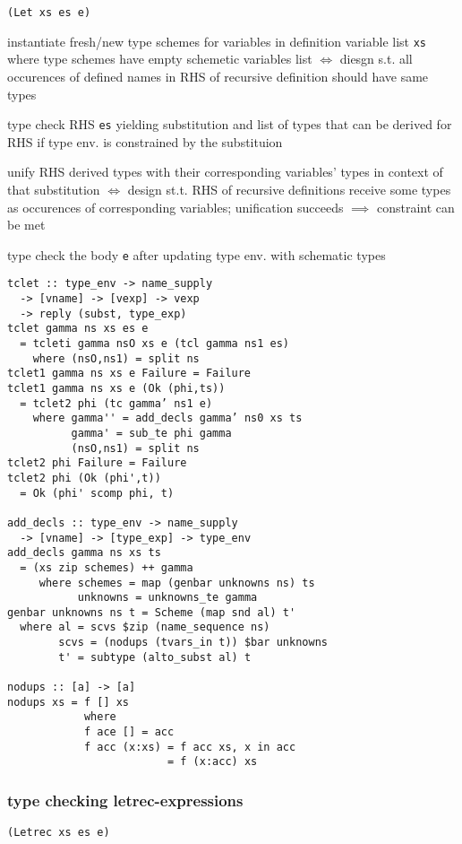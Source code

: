 \documentclass[8pt]{extarticle}
\begin{document}
\begin{multicols*}{2}
\verb|(Let xs es e)|

instantiate fresh/new type schemes for variables in definition variable list \verb|xs| where type schemes have empty schemetic variables list $\iff$ diesgn s.t. all occurences of defined names in RHS of recursive definition should have same types

type check RHS \verb|es| yielding substitution and list of types that can be derived for RHS if type env. is constrained by the substituion

unify RHS derived types with their corresponding variables' types in context of that substitution $\iff$ design st.t. RHS of recursive definitions receive some types as occurences of corresponding variables; unification succeeds $\implies$ constraint can be met

type check the body \verb|e| after updating type env. with schematic types

\begin{verbatim}
tclet :: type_env -> name_supply
  -> [vname] -> [vexp] -> vexp
  -> reply (subst, type_exp)
tclet gamma ns xs es e
  = tcleti gamma nsO xs e (tcl gamma ns1 es)
    where (nsO,ns1) = split ns
tclet1 gamma ns xs e Failure = Failure
tclet1 gamma ns xs e (Ok (phi,ts))
  = tclet2 phi (tc gamma’ ns1 e)
    where gamma'' = add_decls gamma’ ns0 xs ts
          gamma' = sub_te phi gamma
          (nsO,ns1) = split ns
tclet2 phi Failure = Failure
tclet2 phi (Ok (phi',t))
  = Ok (phi' scomp phi, t)

add_decls :: type_env -> name_supply
  -> [vname] -> [type_exp] -> type_env
add_decls gamma ns xs ts
  = (xs zip schemes) ++ gamma
     where schemes = map (genbar unknowns ns) ts
           unknowns = unknowns_te gamma
genbar unknowns ns t = Scheme (map snd al) t'
  where al = scvs $zip (name_sequence ns)
        scvs = (nodups (tvars_in t)) $bar unknowns
        t' = subtype (alto_subst al) t

nodups :: [a] -> [a]
nodups xs = f [] xs
            where
            f ace [] = acc
            f acc (x:xs) = f acc xs, x in acc
                         = f (x:acc) xs
\end{verbatim}

\vfill\null
\columnbreak

\subsubsection{type checking letrec-expressions}

\verb|(Letrec xs es e)|


\end{multicols*}
\end{document}
